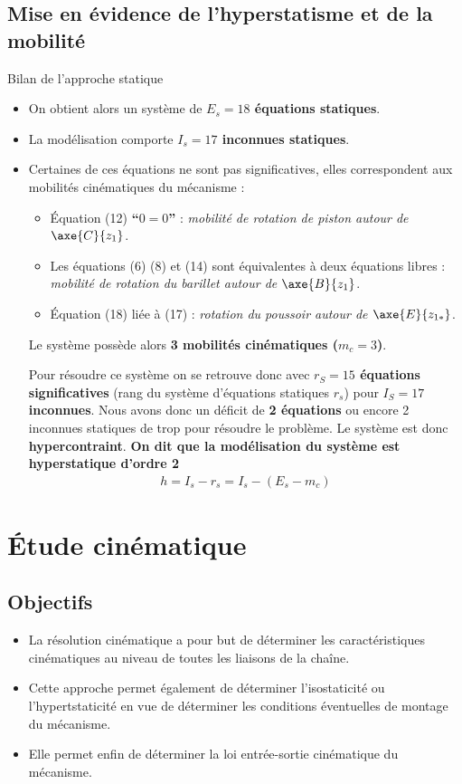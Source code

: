\subsection*{Mise en évidence de l'hyperstatisme et de la mobilité}
Bilan de l'approche statique
\begin{itemize}
\item On obtient alors un système de \textbf{$E_s=18$ équations statiques}.
\item La modélisation comporte \textbf{$I_s=17$ inconnues statiques}.
\item Certaines de ces équations ne sont pas significatives, elles correspondent aux mobilités cinématiques du mécanisme :
\begin{itemize}
\item Équation (12) \textbf{``$0=0$''} : \textit{mobilité de rotation de piston autour de $\axe{C}{{z_1}}$}.
\item Les équations (6) (8) et (14) sont équivalentes à deux équations libres : \textit{mobilité de rotation du barillet autour de $\axe{B}{{z_1}}$}.
\item Équation (18) liée à (17) : \textit{rotation du poussoir autour de $\axe{E}{{z_{1*}}}$}.		
\end{itemize}
Le système possède alors \textbf{3 mobilités cinématiques ($m_c=3$)}.
		
		Pour résoudre ce système on se retrouve donc avec \textbf{$r_S=15$ équations significatives} (rang du système d'équations statiques $r_s$) pour \textbf{$I_S=17$ inconnues}. Nous avons donc un déficit de \textbf{2 équations} ou encore 2 inconnues statiques de trop pour résoudre le problème. Le système est donc \textbf{hypercontraint}.
		\textbf{On dit que la modélisation du système est hyperstatique d'ordre 2}
\begin{align}\label{hyper_statique}
\boxed{
h=I_s-r_s=I_s-(E_s-m_c)
}
\end{align}
		
\end{itemize}




\section*{Étude cinématique}
\subsection*{Objectifs}
\begin{itemize}
\item La résolution cinématique a pour but de déterminer les caractéristiques cinématiques au niveau de toutes les liaisons de la chaîne.
\item Cette approche permet également de déterminer l'isostaticité ou l'hypertstaticité en vue de déterminer les conditions éventuelles de montage du mécanisme.
\item Elle permet enfin de déterminer la loi entrée-sortie cinématique du mécanisme.
\end{itemize}
